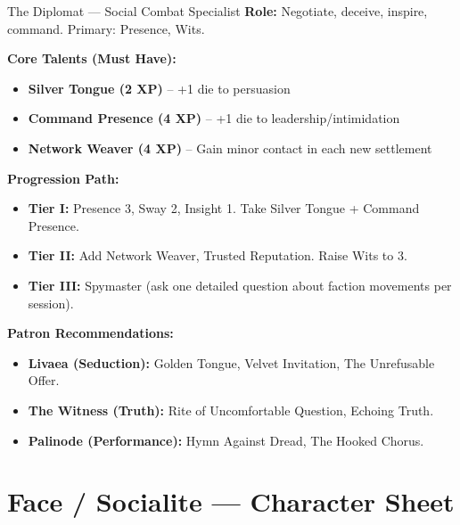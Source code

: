 \documentclass[10pt]{article}
\begin{document}
\begin{tipbox}{The Diplomat --- Social Combat Specialist}
    \textbf{Role:} Negotiate, deceive, inspire, command. Primary: Presence, Wits.
    
    \textbf{Core Talents (Must Have):}
    \begin{itemize}
        \item \textbf{Silver Tongue (2 XP)} -- +1 die to persuasion
        \item \textbf{Command Presence (4 XP)} -- +1 die to leadership/intimidation
        \item \textbf{Network Weaver (4 XP)} -- Gain minor contact in each new settlement
    \end{itemize}
    
    \textbf{Progression Path:}
    \begin{itemize}
        \item \textbf{Tier I:} Presence 3, Sway 2, Insight 1. Take Silver Tongue + Command Presence.
        \item \textbf{Tier II:} Add Network Weaver, Trusted Reputation. Raise Wits to 3.
        \item \textbf{Tier III:} Spymaster (ask one detailed question about faction movements per session).
    \end{itemize}
    
    \textbf{Patron Recommendations:}
    \begin{itemize}
        \item \textbf{Livaea (Seduction):} Golden Tongue, Velvet Invitation, The Unrefusable Offer.
        \item \textbf{The Witness (Truth):} Rite of Uncomfortable Question, Echoing Truth.
        \item \textbf{Palinode (Performance):} Hymn Against Dread, The Hooked Chorus.
    \end{itemize}
\end{tipbox}

\newpage

\section*{Face / Socialite --- Character Sheet}
\end{document}
